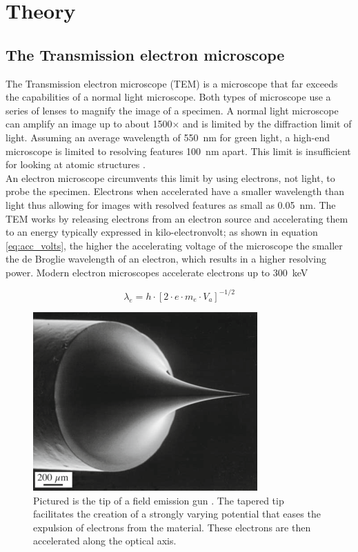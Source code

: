 \section{Theory}

\subsection{The Transmission electron microscope}
The Transmission electron microscope (TEM) is a microscope that far exceeds the capabilities of a normal light microscope. Both types of microscope use a series of lenses to magnify the image of a specimen.
A normal light microscope can amplify an image up to about 1500$\times$ and is limited by the diffraction limit of light. Assuming an average wavelength of \SI{550}{\nm} for green light, a high-end microscope is limited to resolving features \SI{100}{\nm} apart.
This limit is insufficient for looking at atomic structures \cite{PhysRevLett.106.193905}.\\
An electron microscope circumvents this limit by using electrons, not light, to probe the specimen. Electrons when accelerated have a smaller wavelength than light thus allowing for images with resolved features as small as \SI{0.05}{\nm}. \cite{kisielowski_freitag_bischoff_van}
The TEM works by releasing electrons from an electron source and accelerating them to an energy typically expressed in kilo-electronvolt; as shown in equation \ref{eq:acc_volts}, the higher the accelerating voltage of the microscope the smaller the de Broglie wavelength of an electron, which results in a higher resolving power. Modern electron microscopes accelerate electrons up to \SI{300}{\kilo \electronvolt}

\begin{equation}
    \lambda_e = h\cdot \left[ 2 \cdot e \cdot m_e \cdot V_a \right]^{-1/2}
    \label{eq:acc_volts}
\end{equation}

\begin{figure}[h]
    \centering
    \includegraphics[keepaspectratio, width=0.5\linewidth]{resources/Figures/feg.png} 
    \caption{Pictured is the tip of a field emission gun \cite{Williams2009-ww}. The tapered tip facilitates the creation of a strongly varying potential that eases the expulsion of electrons from the material. These electrons are then accelerated along the optical axis.}
    \label{fig:feg}
\end{figure}

